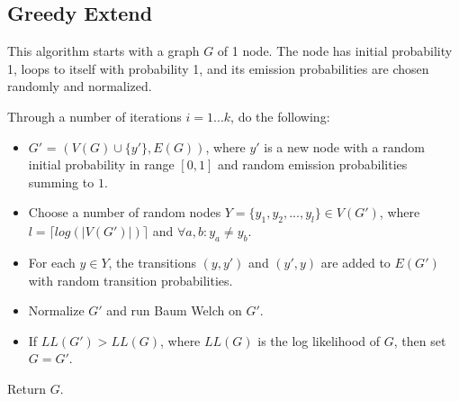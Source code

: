 \subsection{Greedy Extend}
This algorithm starts with a graph $G$ of 1 node. The node has initial probability 1, loops to itself with probability 1, and its emission probabilities are chosen randomly and normalized.

Through a number of iterations $i = 1 ... k$, do the following:
\begin{itemize}
\item $G'$ = $(V(G) \cup \{y'\}, E(G))$, where $y'$ is a new node with a random initial probability in range $[0, 1]$ and random emission probabilities summing to $1$.
\item Choose a number of random nodes $Y = \{y_1, y_2, ... , y_l\} \in V(G')$, where $l = \lceil log(|V(G')|) \rceil$ and $\forall a,b: y_a \neq y_b$.
\item For each $y \in Y$, the transitions $(y, y')$ and $(y', y)$ are added to $E(G')$ with random transition probabilities.
\item Normalize $G'$ and run Baum Welch on $G'$.
\item If $LL(G') > LL(G)$, where $LL(G)$ is the log likelihood of $G$, then set $G = G'$.
\end{itemize}

Return $G$.
